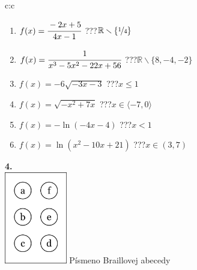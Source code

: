 \documentclass[10pt]{report}
\begin{document}
\begin{tabular}{c:c}
\begin{minipage}[c][104.5mm][t]{0.5\linewidth}
\begin{center}
\begin{minipage}{0.79\linewidth}
\begin{center}
\begin{varwidth}{\linewidth}
\begin{enumerate}
\normalsizerrr
\item $f(x)=\cfrac{-2x+5}{4x-1}$\quad \dotfill\; ???\;\dotfill \quad $\mathbb{R}\smallsetminus\{\nicefrac{1}{4}\}$
\item $f(x)=\cfrac{1}{x^3-5x^2-22x+56}$\quad \dotfill\; ???\;\dotfill \quad $\mathbb{R}\smallsetminus\{8,-4,-2\}$
\item $f(x)=-6\sqrt{-3x-3}$\quad \dotfill\; ???\;\dotfill \quad $x\leq1$
\item $f(x)=\sqrt{-x^2+7x}$\quad \dotfill\; ???\;\dotfill \quad $x\in\langle-7 , 0\rangle$
\item $f(x)=-\ln{(-4x-4)}$\quad \dotfill\; ???\;\dotfill \quad $x<1$
\item $f(x)=\ln{(x^2-10x+21)}$\quad \dotfill\; ???\;\dotfill \quad $x\in(3 , 7)$
\end{enumerate}
\end{varwidth}
\end{center}
\end{minipage}
\begin{minipage}{0.20\linewidth}
\begin{center}
{\Huge\bfseries 4.} \\[2mm]
\includegraphics[height=40mm]{../images/braille.png}
{\small Písmeno Braillovej abecedy}
\end{center}
\end{minipage}
\end{center}
\end{minipage}
%
\end{tabular}
\newpage
\thispagestyle{empty}
\end{document}
